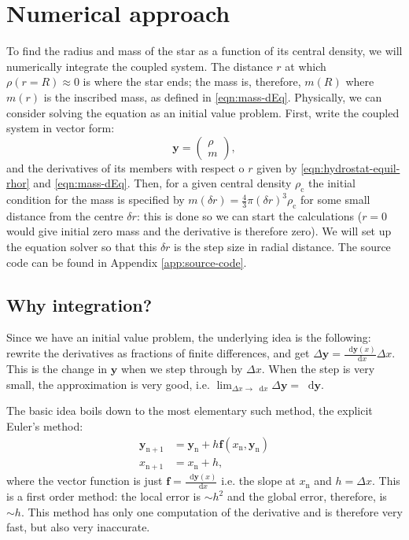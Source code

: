 \documentclass[]{article}
\newcommand{\dd}{\mathop{}\!\mathrm{d}}
\renewcommand{\vec}[1]{\boldsymbol{#1}}
\newcommand{\rhoCentre}{\rho_\mathrm{c}}
\begin{document}
\section{Numerical approach}\label{sec:numerical-approach}
	To find the radius and mass of the star as a function of its central density, we will numerically integrate the coupled system. The distance $r$ at which $\rho (r=R) \approx 0$ is where the star ends; the mass is, therefore, $m(R)$ where $m(r)$ is the inscribed mass, as defined in \eqref{eqn:mass-dEq}. Physically, we can consider solving the equation as an initial value problem. First, write the coupled system in vector form:
	\begin{equation}
		\vec{y} = \begin{pmatrix}
			\rho \\
			m
		\end{pmatrix},
	\end{equation}
	and the derivatives of its members with respect o $r$ given by \eqref{eqn:hydrostat-equil-rhor} and \eqref{eqn:mass-dEq}. Then, for a given central density $\rhoCentre$ the initial condition for the mass is specified by $m(\delta r) = \frac{4}{3} \pi (\delta r)^3 \rhoCentre$ for some small distance from the centre $\delta r$: this is done so we can start the calculations ($r=0$ would give initial zero mass and the derivative is therefore zero). We will set up the equation solver so that this $\delta r$ is the step size in radial distance. The source code can be found in Appendix \ref{app:source-code}.

\subsection{Why integration?}\label{subsec:why-integ}
	Since we have an initial value problem, the underlying idea is the following: rewrite the derivatives as fractions of finite differences, and get $\Delta \vec{y} = \frac{\dd \vec{y}(x)}{\dd x} \Delta x$. This is the change in $\vec{y}$ when we step through by $\Delta x$. When the step is very small, the approximation is very good, i.e. $\lim_{\Delta x \rightarrow \dd x} \Delta \vec{y} = \dd \vec{y}$.

	The basic idea boils down to the most elementary such method, the explicit Euler's method:
	\begin{align}
		\vec{y}_\mathrm{n+1} &= \vec{y}_\mathrm{n} + h \vec{f}(x_\mathrm{n}, \vec{y}_\mathrm{n})\\
		x_\mathrm{n+1} &= x_\mathrm{n} + h, \nonumber
	\end{align}
	where the vector function is just $\vec{f} = \frac{\dd \vec{y}(x)}{\dd x}$ i.e. the slope at $x_\mathrm{n}$ and $h = \Delta x$. This is a first order method: the local error is $\sim h^2$ and the global error, therefore, is $\sim h$. This method has only one computation of the derivative and is therefore very fast, but also very inaccurate.
\end{document}
